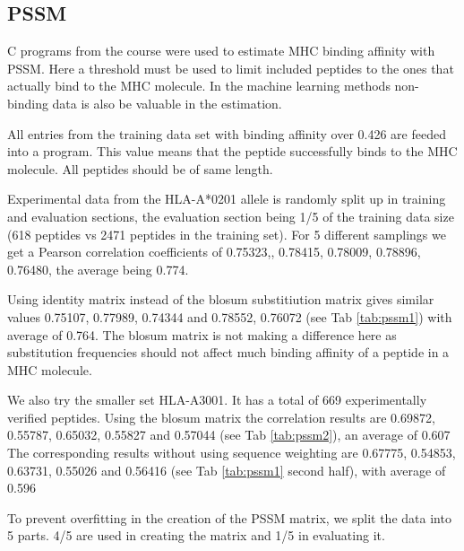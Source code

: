 

\subsection*{PSSM}


C programs from the course were used to estimate MHC binding affinity with PSSM. 
Here a threshold must be used to limit included peptides to the ones that actually bind to the MHC molecule. 
In the machine learning methods non-binding data is also be valuable in the estimation.

All entries from the training data set with binding affinity over 0.426 are feeded into a program. 
This value means that the peptide successfully binds to the MHC molecule. All peptides should be of same length.

Experimental data from the HLA-A*0201 allele is randomly split up in training and evaluation sections, the evaluation section being 1/5 of the training data size (618 peptides vs 2471 peptides in the training set).
For 5 different samplings we get a Pearson correlation coefficients of {0.75323,, 0.78415, 0.78009, 0.78896, 0.76480}, the average being 0.774.

Using identity matrix instead of the blosum substitiution matrix gives similar values 0.75107, 0.77989, 0.74344 and 0.78552, 0.76072 (see Tab \ref{tab:pssm1}) with average of 0.764.
The blosum matrix is not making a difference here as substitution frequencies should not affect much binding affinity of a peptide in a MHC molecule.

We also try the smaller set HLA-A3001. It has a total of 669 experimentally verified peptides.
Using the blosum matrix the correlation results are 0.69872, 0.55787, 0.65032, 0.55827 and 0.57044 (see Tab \ref{tab:pssm2}), an average of 0.607
The corresponding results without using sequence weighting are 0.67775, 0.54853, 0.63731, 0.55026 and 0.56416 (see Tab \ref{tab:pssm1} second half), with average of 0.596

To prevent overfitting in the creation of the PSSM matrix, we split the data into 5 parts. 4/5 are used in creating the matrix and 1/5 in evaluating it.

